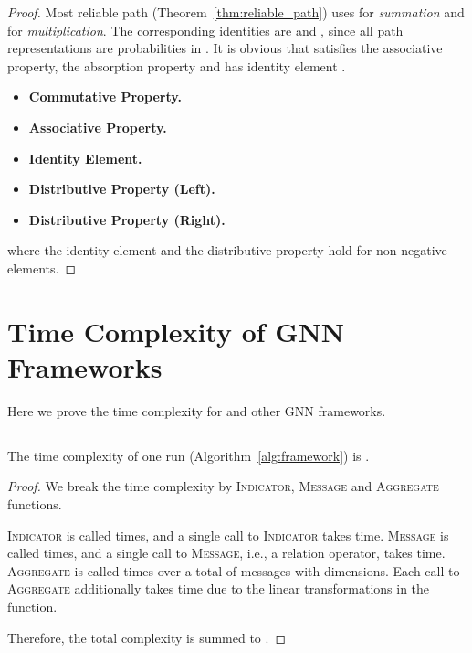 \begin{proof}
Most reliable path (Theorem~\ref{thm:reliable_path}) uses  for \emph{summation} and  for \emph{multiplication}.  The corresponding identities are  and , since all path representations are probabilities in . It is obvious that  satisfies the associative property, the absorption property and has identity element .
\begin{itemize}
    \setlength{\parskip}{0pt}
    \setlength{\itemsep}{0pt plus 1pt}
    \item \textbf{Commutative Property.} 
    \item \textbf{Associative Property.} 
    \item \textbf{Identity Element.} 
    \item \textbf{Distributive Property (Left).} 
    \item \textbf{Distributive Property (Right).} 
\end{itemize}
where the identity element and the distributive property hold for non-negative elements.
\end{proof}

\section{Time Complexity of GNN Frameworks}
\label{app:complexity}

Here we prove the time complexity for \method and other GNN frameworks.

\subsection{\method}

\begin{lemma}
\label{lem:bellmanford}
The time complexity of one \method run (Algorithm~\ref{alg:framework}) is .
\end{lemma}
\begin{proof}
We break the time complexity by \textsc{Indicator}, \textsc{Message} and \textsc{Aggregate} functions.

\textsc{Indicator} is called  times, and a single call to \textsc{Indicator} takes  time. \textsc{Message} is called  times, and a single call to \textsc{Message}, i.e., a relation operator, takes  time. \textsc{Aggregate} is called  times over a total of  messages with  dimensions. Each call to \textsc{Aggregate} additionally takes  time due to the linear transformations in the function.

Therefore, the total complexity is summed to .
\end{proof}

